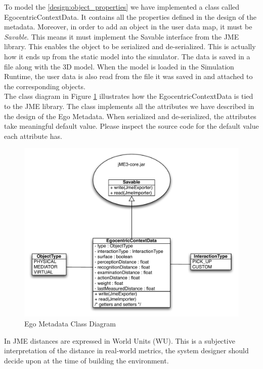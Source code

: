 To model the \ref{design:object_properties} we have implemented a class called EgocentricContextData. It contains all the properties defined in the design of the metadata. Moreover, in order to add an object in the user data map, it must be \emph{Savable}. This means it must implement the Savable interface from the JME library. This enables the object to be serialized and de-serialized. This is actually how it ends up from the static model into the simulator. The data is saved in a file along with the 3D model. When the model is loaded in the Simulation Runtime, the user data is also read from the file it was saved in and attached to the corresponding objects.\\

The class diagram in Figure \ref{fig:impl_egocentric_context_data} illustrates how the EgocentricContextData is tied to the JME library. The class implements all the attributes we have described in the design of the Ego Metadata. When serialized and de-serialized, the attributes take meaningful default value. Please inspect the source code for the default value each attribute has.
\begin{figure}[H]
	\centering
	\includegraphics[width=\linewidth]{gfx/Chapter4/ego_metadata}
	\caption{Ego Metadata Class Diagram}
	\label{fig:impl_egocentric_context_data}
\end{figure}

In JME distances are expressed in World Units (WU). This is a subjective interpretation of the distance in real-world metrics, the system designer should decide upon at the time of building the environment.\\

